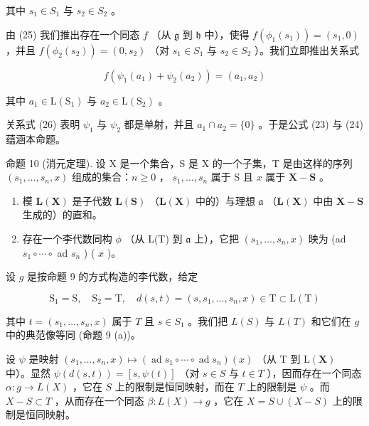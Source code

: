 其中 \(s_{1} \in S_{1}\) 与 \(s_{2} \in S_{2}\) 。

由 (25) 我们推出存在一个同态 \(f\) （从 \(\mathfrak{g}\) 到 \(\mathfrak{h}\) 中），使得 \(f(\phi_1(s_1)) = (s_1, 0)\) ，并且 \(f(\phi_2(s_2)) = (0, s_2)\) （对 \(s_1 \in S_1\) 与 \(s_2 \in S_2\) ）。我们立即推出关系式

\[
f (\psi_ {1} (a _ {1}) + \psi_ {2} (a _ {2})) = (a _ {1}, a _ {2})\tag{26}
\]

其中 \(a_1 \in \mathrm{L}(\mathrm{S}_1)\) 与 \(a_2 \in \mathrm{L}(\mathrm{S}_2)\) 。

关系式 (26) 表明 \(\psi_{1}\) 与 \(\psi_{2}\) 都是单射，并且 \(a_{1} \cap a_{2} = \{0\}\) 。于是公式 (23) 与 (24) 蕴涵本命题。

命题 10 (消元定理). 设 X 是一个集合，S 是 X 的一个子集，T 是由这样的序列 \((s_1, \ldots, s_n, x)\) 组成的集合：\(n \geqslant 0\) ， \(s_1, \ldots, s_n\) 属于 S 且 \(x\) 属于 \(\mathbf{X} - \mathbf{S}\) 。

\begin{enumerate}
\def\labelenumi{(\alph{enumi})}
\item
  模 \(\mathbf{L}(\mathbf{X})\) 是子代数 \(\mathbf{L}(\mathbf{S})\) （\(\mathbf{L}(\mathbf{X})\) 中的）与理想 \(\mathfrak{a}\) （\(\mathbf{L}(\mathbf{X})\) 中由 \(\mathbf{X} - \mathbf{S}\) 生成的）的直和。
\item
  存在一个李代数同构 \(\phi\) （从 L(T) 到 \(\mathfrak{a}\) 上），它把 \((s_1, \ldots, s_n, x)\) 映为 (ad \(s_1 \circ \cdots \circ\) ad \(s_n\) ) ( \(x\) )。
\end{enumerate}

设 \(g\) 是按命题 9 的方式构造的李代数，给定

\[
\mathrm{S} _ {1} = \mathrm{S}, \quad \mathrm{S} _ {2} = \mathrm{T}, \quad d (s, t) = (s, s _ {1}, \dots , s _ {n}, x) \in \mathrm{T} \subset \mathrm{L} (\mathrm{T})
\]

其中 \(t = (s_1, \ldots, s_n, x)\) 属于 \(T\) 且 \(s \in S_1\) 。我们把 \(L(S)\) 与 \(L(T)\) 和它们在 \(g\) 中的典范像等同 (命题 9 (a))。

设 \(\psi\) 是映射 \((s_1, \ldots, s_n, x) \mapsto (\operatorname{ad} s_1 \circ \cdots \circ \operatorname{ad} s_n)(x)\) （从 T 到 \(\mathrm{L}(\mathbf{X})\) 中）。显然 \(\psi(d(s, t)) = [s, \psi(t)]\) （对 \(s \in S\) 与 \(t \in T\) ），因而存在一个同态 \(\alpha: g \to L(X)\) ，它在 \(S\) 上的限制是恒同映射，而在 \(T\) 上的限制是 \(\psi\) 。而 \(X - S \subset T\) ，从而存在一个同态 \(\beta: L(X) \to g\) ，它在 \(X = S \cup (X - S)\) 上的限制是恒同映射。

